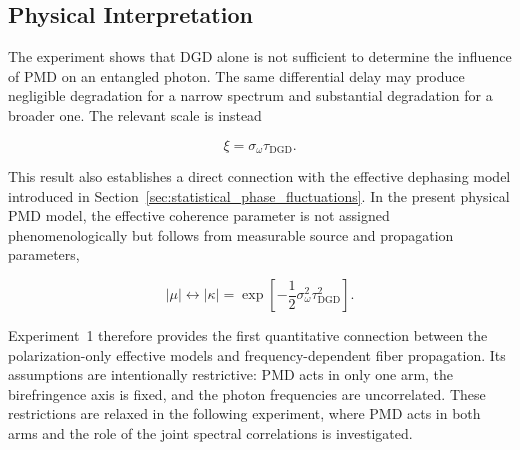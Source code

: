 \subsection{Physical Interpretation}
\label{subsec:experiment_1_physical_interpretation}

The experiment shows that DGD alone is not sufficient to determine the influence
of PMD on an entangled photon. The same differential delay may produce negligible
degradation for a narrow spectrum and substantial degradation for a broader one.
The relevant scale is instead

\[
\boxed{
\xi=\sigma_\omega\tau_{\mathrm{DGD}}
}.
\]

This result also establishes a direct connection with the effective dephasing model
introduced in Section~\ref{sec:statistical_phase_fluctuations}. In the present
physical PMD model, the effective coherence parameter is not assigned
phenomenologically but follows from measurable source and propagation parameters,

\begin{equation}
|\mu|
\longleftrightarrow
|\kappa|
=
\exp
\left[
-\frac{1}{2}
\sigma_\omega^2
\tau_{\mathrm{DGD}}^2
\right].
\label{eq:experiment_1_effective_dephasing_connection}
\end{equation}

Experiment~1 therefore provides the first quantitative connection between the
polarization-only effective models and frequency-dependent fiber propagation.
Its assumptions are intentionally restrictive: PMD acts in only one arm, the
birefringence axis is fixed, and the photon frequencies are uncorrelated. These
restrictions are relaxed in the following experiment, where PMD acts in both arms
and the role of the joint spectral correlations is investigated.